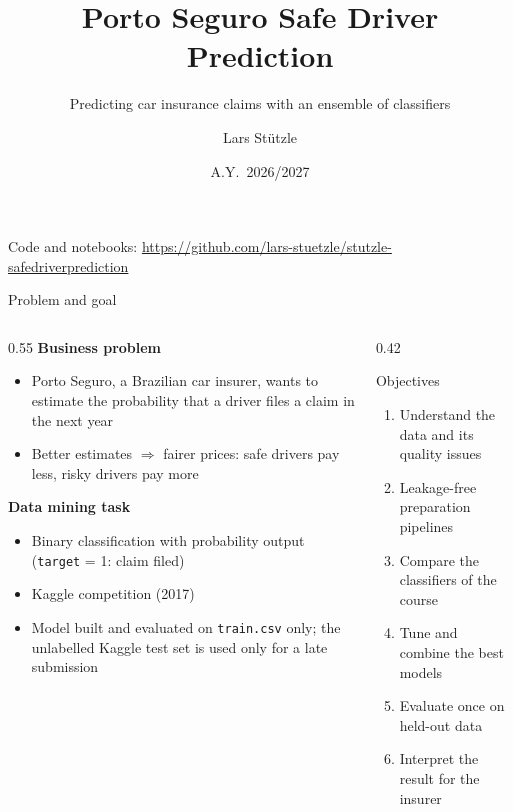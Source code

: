 \documentclass[aspectratio=169,11pt]{beamer}
\title{Porto Seguro Safe Driver Prediction}
\subtitle{Predicting car insurance claims with an ensemble of classifiers}
\author{Lars St\"utzle}
\institute{B3155 Project Work in Machine Learning and Data Mining\\
           Prof.\ Claudio Sartori -- University of Bologna}
\date{A.Y.\ 2026/2027}
\newcommand{\feat}[1]{\texttt{\small #1}}   %
\begin{document}
\begin{frame}[plain]
  \titlepage
  \vfill
  \centering\scriptsize Code and notebooks: \url{https://github.com/lars-stuetzle/stutzle-safedriverprediction}
\end{frame}

\begin{frame}{Problem and goal}
  \begin{columns}[T]
    \begin{column}{0.55\textwidth}
      \textbf{Business problem}
      \begin{itemize}
        \item Porto Seguro, a Brazilian car insurer, wants to estimate the probability that a driver files a
              claim in the next year
        \item Better estimates $\Rightarrow$ fairer prices: safe drivers pay less, risky drivers pay more
      \end{itemize}
      \medskip
      \textbf{Data mining task}
      \begin{itemize}
        \item Binary classification with probability output (\feat{target} = 1: claim filed)
        \item Kaggle competition (2017)
        \item Model built and evaluated on \feat{train.csv} only; the unlabelled Kaggle test set is used only
              for a late submission
      \end{itemize}
    \end{column}
    \begin{column}{0.42\textwidth}
      \begin{block}{Objectives}
        \begin{enumerate}
          \item Understand the data and its quality issues
          \item Leakage-free preparation pipelines
          \item Compare the classifiers of the course
          \item Tune and combine the best models
          \item Evaluate once on held-out data
          \item Interpret the result for the insurer
        \end{enumerate}
      \end{block}
    \end{column}
  \end{columns}
\end{frame}
\end{document}
